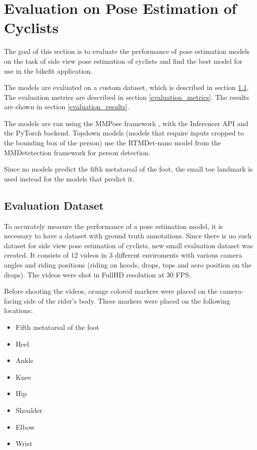 \chapter{Evaluation on Pose Estimation of Cyclists}
\label{evaluation}

The goal of this section is to evaluate the performance of pose estimation models on the task of side view pose estimation of cyclists and find the best model for use in the bikefit application.

The models are evaluated on a custom dataset, which is described in section \ref{evaluation_dataset}. The evaluation metrics are described in section \ref{evaluation_metrics}. The results are shown in section \ref{evaluation_results}.

The models are ran using the MMPose framework \cite{mmpose2020}, with the Inferencer API and the PyTorch backend. Topdown models (models that require inputs cropped to the bounding box of the person) use the RTMDet-nano model \cite{rtmdet} from the MMDetetection framework \cite{mmdetection} for person detection.

Since no models predict the fifth metatarsal of the foot, the small toe landmark is used instead for the models that predict it.



\section{Evaluation Dataset}
\label{evaluation_dataset}
To accurately measure the performance of a pose estimation model, it is necessary to have a dataset with ground truth annotations. Since there is no such dataset for side view pose estimation of cyclists, new small evaluation dataset was created. It consists of 12 videos in 3 different enviroments with various camera angles and riding positions (riding on hoods, drops, tops and aero position on the drops). The videos were shot in FullHD resolution at 30 FPS.

Before shooting the videos, orange colored markers were placed on the camera-facing side of the rider's body. These markers were placed on the following locations:

\begin{itemize}
    \item Fifth metatarsal of the foot
    \item Heel
    \item Ankle
    \item Knee
    \item Hip
    \item Shoulder
    \item Elbow
    \item Wrist
\end{itemize}

